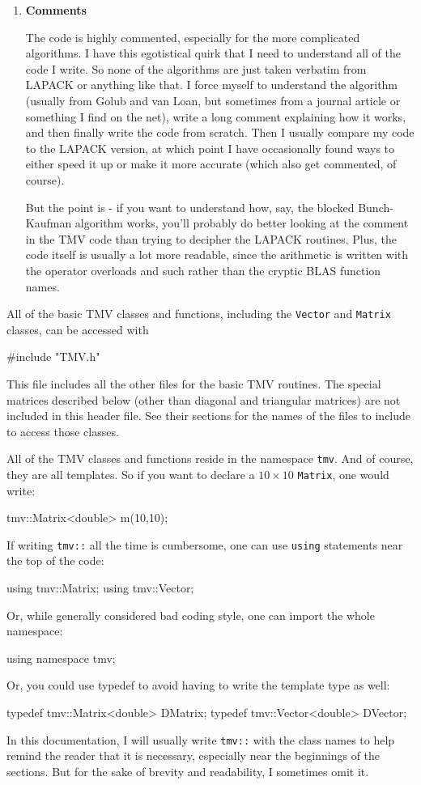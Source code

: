 \documentclass[twoside,letterpaper,11pt]{article}
\renewcommand{\tt}[1]{{\lstinline {#1}}}
\begin{document}
\begin{enumerate}
\item
\textbf{Comments}

The code is highly commented, especially for the more complicated algorithms.
I have this egotistical quirk that I need to understand all of the code I write.
So none of the algorithms are just taken verbatim from LAPACK or anything like that.
I force myself to understand the algorithm (usually from Golub and van Loan,
but sometimes from a journal article or something I find on the net),
write a long comment explaining how it works, and then finally write the code
from scratch.  Then I usually compare my code to the LAPACK version, at which point
I have occasionally found ways to either speed it up or make it more accurate
(which also get commented, of course).

But the point is - if you want to understand how, say, the blocked Bunch-Kaufman
algorithm works, you'll probably do better looking at the comment in the 
TMV code than trying to decipher the LAPACK routines.  Plus, the code itself is
usually a lot more readable, since the arithmetic is written with the operator
overloads and such rather than the cryptic BLAS function names.

\end{enumerate}

All of the basic TMV classes and functions, including the \tt{Vector} and \tt{Matrix} 
classes, can be accessed with
\begin{tmvcode}
#include "TMV.h"
\end{tmvcode}
This file includes all the other files for the basic TMV routines.  The 
special matrices described below (other than diagonal and triangular matrices) 
are not included in this header file.
See their sections for the names
of the files to include to access those classes.

All of the TMV classes and functions reside in the namespace \tt{tmv}. 
And of course, they are all templates.
So if you want to declare a $10 \times 10$ \tt{Matrix}, one would write:
\begin{tmvcode}
tmv::Matrix<double> m(10,10);
\end{tmvcode}

If writing \tt{tmv::} all the time is cumbersome, one can use \tt{using}
statements near the top of the code:
\begin{tmvcode}
using tmv::Matrix;
using tmv::Vector;
\end{tmvcode}
Or, while generally considered bad coding style, one can import the whole namespace:
\begin{tmvcode}
using namespace tmv;
\end{tmvcode}
Or, you could use typedef to avoid having to write the template type as well:
\begin{tmvcode}
typedef tmv::Matrix<double> DMatrix;
typedef tmv::Vector<double> DVector;
\end{tmvcode}
In this documentation, I will usually write \tt{tmv::} with the class names to help remind the reader
that it is necessary, especially near the 
beginnings of the sections.  
But for the sake of brevity and readability, I sometimes omit it.
\end{document}
